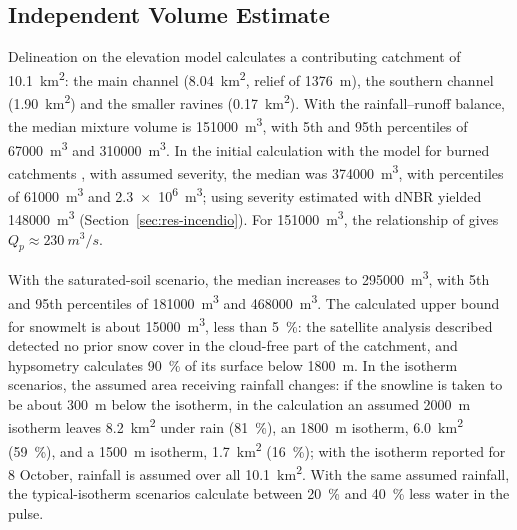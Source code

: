 \subsection{Independent Volume Estimate}\label{sec:res-volumen}
Delineation on the elevation model calculates a contributing catchment of \SI{10.1}{km^2}: the main channel (\SI{8.04}{km^2}, relief of \SI{1376}{m}), the southern channel (\SI{1.90}{km^2}) and the smaller ravines (\SI{0.17}{km^2}). With the rainfall--runoff balance, the median mixture volume is \SI{151000}{m^3}, with 5th and 95th percentiles of \SI{67000}{m^3} and \SI{310000}{m^3}. In the initial calculation with the model for burned catchments \citep{gartner2014}, with assumed severity, the median was \SI{374000}{m^3}, with percentiles of \SI{61000}{m^3} and \SI{2.3e6}{m^3}; using severity estimated with dNBR yielded \SI{148000}{m^3} (Section~\ref{sec:res-incendio}). For \SI{151000}{m^3}, the relationship of \citet{mizuyama1992} gives $Q_p\approx\SI{230}{m^3/s}$.

With the saturated-soil scenario, the median increases to \SI{295000}{m^3}, with 5th and 95th percentiles of \SI{181000}{m^3} and \SI{468000}{m^3}. The calculated upper bound for snowmelt is about \SI{15000}{m^3}, less than \SI{5}{\percent}: the satellite analysis described detected no prior snow cover in the cloud-free part of the catchment, and hypsometry calculates \SI{90}{\percent} of its surface below \SI{1800}{m}. In the isotherm scenarios, the assumed area receiving rainfall changes: if the snowline is taken to be about \SI{300}{m} below the isotherm, in the calculation an assumed \SI{2000}{m} isotherm leaves \SI{8.2}{km^2} under rain (\SI{81}{\percent}), an \SI{1800}{m} isotherm, \SI{6.0}{km^2} (\SI{59}{\percent}), and a \SI{1500}{m} isotherm, \SI{1.7}{km^2} (\SI{16}{\percent}); with the isotherm reported for 8 October, rainfall is assumed over all \SI{10.1}{km^2}. With the same assumed rainfall, the typical-isotherm scenarios calculate between \SI{20}{\percent} and \SI{40}{\percent} less water in the pulse.

